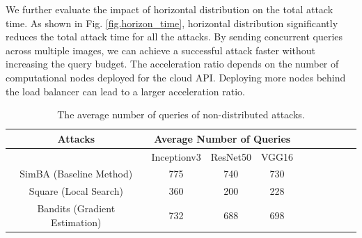 
We further evaluate the impact of horizontal distribution on the total attack time. As shown in Fig. \ref{fig.horizon_time}, horizontal distribution significantly reduces the total attack time for all the attacks. By sending concurrent queries across multiple images, we can achieve a successful attack faster without increasing the query budget. The acceleration ratio depends on the number of computational nodes deployed for the cloud API. Deploying more nodes behind the load balancer can lead to a larger acceleration ratio.

\begin{table}[bth]
\begin{center}
\begin{tabular}{cccccccccc}
\hline
Attacks & \multicolumn{3}{c}{Average Number of Queries} \\ \hline
        & Inceptionv3           & ResNet50             & VGG16         \\
SimBA (Baseline Method)   & 775   & 740    & 730  \\
Square (Local Search)  & 360   & 200    & 228  \\
Bandits (Gradient Estimation) & 732   & 688   & 698 \\ \hline
\end{tabular}
\end{center}
\caption{The average number of queries of non-distributed attacks.}
\label{tab:non}
\end{table}

